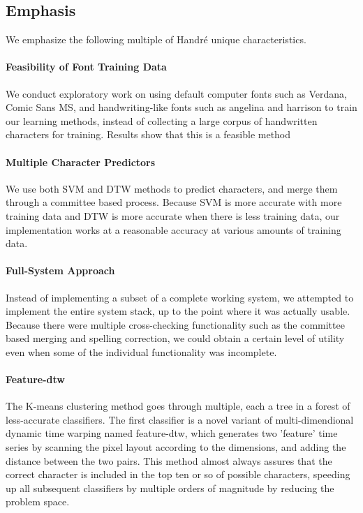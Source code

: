 \documentclass[12pt]{article}
\begin{document}
\subsection{Emphasis}
	We emphasize the following multiple of Handr\'{e} unique characteristics.
	
	\paragraph{Feasibility of Font Training Data} We conduct exploratory work on using default computer fonts such as Verdana, Comic Sans MS, and handwriting-like fonts such as angelina and harrison to train our learning methods, instead of collecting a large corpus of handwritten characters for training. Results show that this is a feasible method
	
	\paragraph{Multiple Character Predictors} We use both SVM and DTW methods to predict characters, and merge them through a committee based process. Because SVM is more accurate with more training data and DTW is more accurate when there is less training data, our implementation works at a reasonable accuracy at various amounts of training data.
	
	\paragraph{Full-System Approach} Instead of implementing a subset of a complete working system, we attempted to implement the entire system stack, up to the point where it was actually usable. Because there were multiple cross-checking functionality such as the committee based merging and spelling correction, we could obtain a certain level of utility even when some of the individual functionality was incomplete.
	
	\paragraph{Feature-dtw} The K-means clustering method goes through multiple, each a tree in a forest of less-accurate classifiers. The first classifier is a novel variant of multi-dimendional dynamic time warping named feature-dtw, which generates two 'feature' time series by scanning the pixel layout according to the dimensions, and adding the distance between the two pairs. This method almost always assures that the correct character is included in the top ten or so of possible characters, speeding up all subsequent classifiers by multiple orders of magnitude by reducing the problem space.
\end{document}
